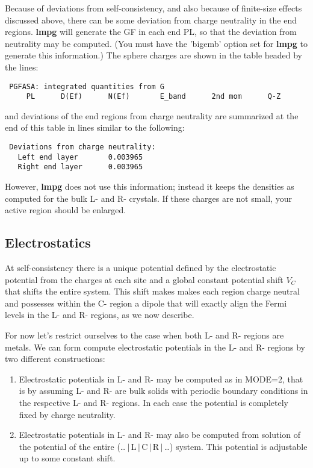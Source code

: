 \documentclass{article}
\begin{document}
Because of deviations from self-consistency, and also because of
finite-size effects discussed above, there can be some deviation
from charge neutrality in the end regions.  {\bf lmpg} will
generate the GF in each end PL, so that the deviation from
neutrality may be computed. (You must have the 'bigemb' option
set for {\bf lmpg} to generate this information.)  The sphere
charges are shown in the table headed by the lines:
\begin{verbatim}
 PGFASA: integrated quantities from G
     PL      D(Ef)      N(Ef)       E_band      2nd mom      Q-Z
\end{verbatim}
and deviations of the end regions from charge neutrality are summarized
at the end of this table in lines similar to the following:
\begin{verbatim}
 Deviations from charge neutrality:
   Left end layer       0.003965
   Right end layer      0.003965
\end{verbatim}
However, {\bf lmpg} does not use this information; instead it
keeps the densities as computed for the bulk L- and R- crystals.
If these charges are not small, your active region should be
enlarged.

\subsection{Electrostatics}
\label{sec:electrostatics}

At self-consistency there is a unique potential defined by the
electrostatic potential from the charges at each site and a
global constant potential shift $V_C$ that shifts the entire
system.  This shift makes makes each region charge neutral and
possesses within the C- region a dipole that will exactly align
the Fermi levels in the L- and R- regions, as we now describe.

For now let's restrict ourselves to the case when both L- and R-
regions are metals.  We can form compute electrostatic potentials
in the L- and R- regions by two different constructions:

\begin{enumerate}

\item Electrostatic potentials in L- and R- may be computed as in
      MODE=2, that is by assuming L- and R- are bulk solids with
      periodic boundary conditions in the respective L- and R-
      regions.  In each case the potential is completely fixed by
      charge neutrality.

\item Electrostatic potentials in L- and R- may also be computed
      from solution of the potential of the entire
      (\dots\,$|$\,L\,$|$\,C\,$|$\,R\,$|$\,\dots) system.  This
      potential is adjustable up to some constant shift.

\end{enumerate}
\end{document}
